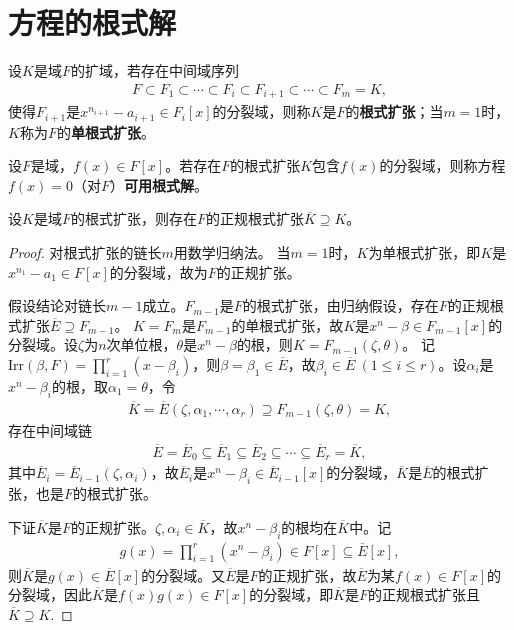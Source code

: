 \documentclass[../../main.tex]{subfiles}%
\begin{document}
\section{方程的根式解}

\begin{definition}
设$K$是域$F$的扩域，若存在中间域序列
\begin{align}
F\subset F_1\subset\cdots\subset F_i\subset F_{i+1}\subset\cdots\subset F_m=K,\label{eq:radical_ext_seq}
\end{align}
使得$F_{i+1}$是$x^{n_{i+1}}-a_{i+1}\in F_i[x]$的分裂域，则称$K$是$F$的\textbf{根式扩张}；当$m=1$时，$K$称为$F$的\textbf{单根式扩张}。
\end{definition}

\begin{definition}
设$F$是域，$f(x)\in F[x]$。若存在$F$的根式扩张$K$包含$f(x)$的分裂域，则称方程$f(x)=0$（对$F$）\textbf{可用根式解}。
\end{definition}

\begin{theorem}
设$K$是域$F$的根式扩张，则存在$F$的正规根式扩张$\overline{K}\supseteq K$。
\end{theorem}
\begin{proof}
对根式扩张的链长$m$用数学归纳法。
当$m=1$时，$K$为单根式扩张，即$K$是$x^{n_1}-a_1\in F[x]$的分裂域，故为$F$的正规扩张。

假设结论对链长$m-1$成立。$F_{m-1}$是$F$的根式扩张，由归纳假设，存在$F$的正规根式扩张$\overline{E}\supseteq F_{m-1}$。
$K=F_m$是$F_{m-1}$的单根式扩张，故$K$是$x^n-\beta\in F_{m-1}[x]$的分裂域。设$\zeta$为$n$次单位根，$\theta$是$x^n-\beta$的根，则$K=F_{m-1}(\zeta,\theta)$。
记$\mathrm{Irr}(\beta,F)=\prod\limits_{i=1}^r(x-\beta_i)$，则$\beta=\beta_1\in\overline{E}$，故$\beta_i\in\overline{E}\ (1\leqslant i\leqslant r)$。设$\alpha_i$是$x^n-\beta_i$的根，取$\alpha_1=\theta$，令
\begin{align*}
\overline{K}=\overline{E}(\zeta,\alpha_1,\cdots,\alpha_r)\supseteq F_{m-1}(\zeta,\theta)=K,
\end{align*}
存在中间域链
\begin{align*}
\overline{E}=\overline{E}_0\subseteq\overline{E}_1\subseteq\overline{E}_2\subseteq\cdots\subseteq\overline{E}_r=\overline{K},
\end{align*}
其中$\overline{E}_i=\overline{E}_{i-1}(\zeta,\alpha_i)$，故$\overline{E}_i$是$x^n-\beta_i\in\overline{E}_{i-1}[x]$的分裂域，$\overline{K}$是$\overline{E}$的根式扩张，也是$F$的根式扩张。

下证$\overline{K}$是$F$的正规扩张。$\zeta,\alpha_i\in\overline{K}$，故$x^n-\beta_i$的根均在$\overline{K}$中。记
\begin{align*}
g(x)=\prod\limits_{i=1}^r(x^n-\beta_i)\in F[x]\subseteq\overline{E}[x],
\end{align*}
则$\overline{K}$是$g(x)\in\overline{E}[x]$的分裂域。又$\overline{E}$是$F$的正规扩张，故$\overline{E}$为某$f(x)\in F[x]$的分裂域，因此$\overline{K}$是$f(x)g(x)\in F[x]$的分裂域，即$\overline{K}$是$F$的正规根式扩张且$\overline{K}\supseteq K$.
\end{proof}
\end{document}
